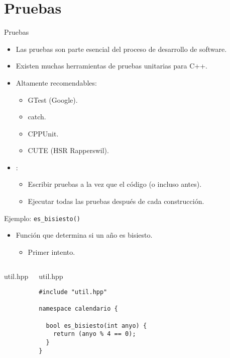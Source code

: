 \section{Pruebas}
\label{sec:funciones:pruebas}

\begin{frame}[t]{Pruebas}
\begin{itemize}
  \item Las pruebas son parte esencial del proceso de desarrollo de software.
  \item Existen muchas herramientas de pruebas unitarias para C++.
  \item Altamente recomendables:
    \begin{itemize}
      \item GTest (Google).
      \item catch.
      \item CPPUnit.
      \item CUTE (HSR Rapperswil).
    \end{itemize}

  \item {}:
    \begin{itemize}
      \item Escribir pruebas a la vez que el código (o incluso antes).
      \item Ejecutar todas las pruebas después de cada construcción.
    \end{itemize}
\end{itemize}
\end{frame}

\begin{frame}[t,fragile]{Ejemplo: \texttt{es\_bisiesto()}}
\begin{itemize}
  \item Función que determina si un año es bisiesto.
    \begin{itemize}
      \item Primer intento.
    \end{itemize}
\end{itemize}

\begin{columns}[T]

\begin{block}{util.hpp}

\end{block}

\begin{block}{util.hpp}
\begin{lstlisting}
#include "util.hpp"

namespace calendario {

  bool es_bisiesto(int anyo) {
    return (anyo % 4 == 0);
  }
}
\end{lstlisting}
\end{block}


\end{columns}
\end{frame}


